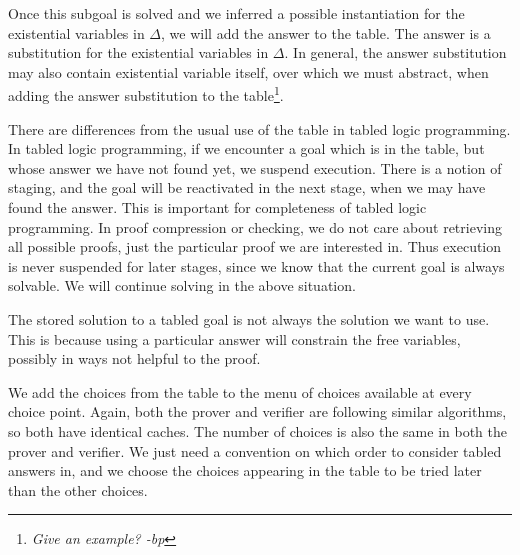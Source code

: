 \documentclass{acmconf}
\newcommand{\ednote}[1]{\footnote{\it #1}}
\begin{document}
Once this subgoal is solved and we inferred a possible instantiation
for the existential variables in $\Delta$, we will add the answer to
the table. The answer is a substitution for the existential variables
in $\Delta$. In general, the answer substitution may also contain
existential variable itself, over which we must abstract, when adding
the answer substitution to the table\ednote{Give an example? -bp}.

There are differences from the usual use of the table in tabled logic
programming. In tabled logic programming, if we encounter a goal which
is in the table, but whose answer we have not found yet, we suspend
execution. There is a notion of staging, and the goal will be
reactivated in the next stage, when we may have found the answer. This
is important for completeness of tabled logic programming. In proof
compression or checking, we do not care about retrieving all possible
proofs, just the particular proof we are interested in. Thus execution
is never suspended for later stages, since we know that the current
goal is always solvable. We will continue solving in the above situation.

The stored solution to a tabled goal is not always the solution we
want to use.  This is because using a particular answer will constrain
the free variables, possibly in ways not helpful to the proof. 

We add the choices from the table to the menu of choices available at
every choice point. Again, both the prover and verifier are following
similar algorithms, so both have identical caches. The number of
choices is also the same in both the prover and verifier. We just need
a convention on which order to consider tabled answers in, and we
choose the choices appearing in the table to be tried later than the
other choices.
\end{document}
